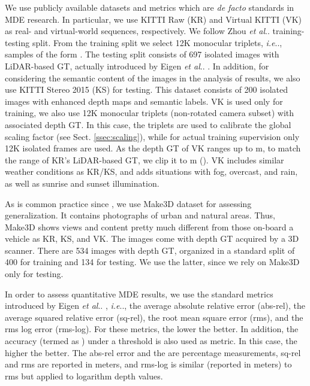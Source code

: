 \documentclass[journal]{IEEEtran}
\makeatletter
\DeclareRobustCommand\onedot{\futurelet\@let@token\@onedot}
\def\@onedot{\ifx\@let@token.\else.\null\fi\xspace}
\def\ie{\emph{i.e}\onedot} \def\Ie{\emph{I.e}\onedot}
\def\etal{\emph{et al}\onedot}
\newcommand{\sSect}[1]{Sect. \ref{ssec:#1}}
\makeatother
\begin{document}
We use publicly available datasets and metrics which are \emph{de facto} standards in MDE research. In particular, we use KITTI Raw (KR) \cite{Geiger:2013} and Virtual KITTI (VK) \cite{Cabon:2020} as real- and virtual-world sequences, respectively. We follow Zhou {\etal} \cite{Zhou:2017} training-testing split. From the training split we select 12K monocular triplets, {\ie}, samples of the form . The testing split consists of 697 isolated images with LiDAR-based GT, actually introduced by Eigen {\etal} \cite{Eigen:2014}. In addition, for considering the semantic content of the images in the analysis of results, we also use KITTI Stereo 2015 (KS) \cite{Menze:2015} for testing. This dataset consists of 200 isolated images with enhanced depth maps and semantic labels. VK is used only for training, we also use 12K monocular triplets (non-rotated camera subset) with associated depth GT. In this case, the triplets are used to calibrate the global scaling factor  (see \sSect{scaling}), while for actual training supervision only 12K isolated frames are used. As the depth GT of VK ranges up to m, to match the range of KR's LiDAR-based GT, we clip it to m (). VK includes similar weather conditions as KR/KS, and adds situations with fog, overcast, and rain, as well as sunrise and sunset illumination. 

As is common practice since \cite{Godard:2017}, we use Make3D dataset \cite{Saxena:2009} for assessing generalization. It contains photographs of urban and natural areas. Thus, Make3D shows views and content pretty much different from those on-board a vehicle as KR, KS, and VK. The images come with depth GT acquired by a 3D scanner. There are 534 images with depth GT, organized in a standard split of 400 for training and 134 for testing. We use the latter, since we rely on Make3D only for testing. 

In order to assess quantitative MDE results, we use the standard metrics introduced by Eigen {\etal} \cite{Eigen:2014}, {\ie}, the average absolute relative error (abs-rel), the average squared relative error (sq-rel), the root mean square error (rms), and the rms log error (rms-log). For these metrics, the lower the better. In addition, the accuracy (termed as ) under a threshold  is also used as metric. In this case, the higher the better. The abs-rel error and the  are percentage measurements, sq-rel and rms are reported in meters, and rms-log is similar (reported in meters) to rms but applied to logarithm depth values. 
\end{document}
